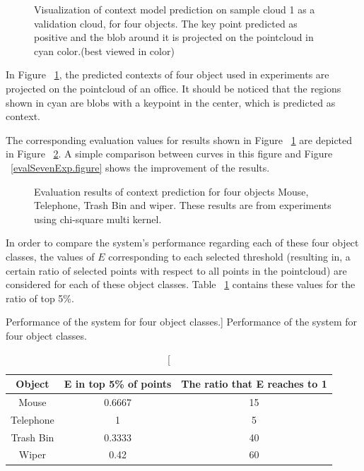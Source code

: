 \begin{figure} [htp]
\begin{center}
  \end{center}
  \caption[Visualization of context model prediction on sample cloud 1 from validation set.]
  {Visualization of context model prediction on sample cloud 1 as a validation cloud, for four objects. The key point predicted as positive and the blob around it is projected on the pointcloud in cyan color.(best viewed in color)}
  \label{ContextPrediction_518_1.figure:edge}
\end{figure}

In Figure ~\ref{ContextPrediction_518_1.figure:edge}, the predicted contexts of four object used in experiments 
are projected on the pointcloud of an office.
It should be noticed that the regions shown in cyan are blobs with a keypoint in the center, which is predicted as 
context.

The corresponding evaluation values for results shown in Figure ~\ref{ContextPrediction_518_1.figure:edge} are depicted
in Figure ~\ref{Eval_518_1.figure}.
A simple comparison between curves in this figure and Figure ~\ref{evalSevenExp.figure} shows the improvement of the 
results.

\begin{figure}
  \begin{center}
  \caption[Evaluation results for four object classes.]
  {Evaluation results of context prediction for four objects Mouse, Telephone, Trash Bin and wiper. These results are from experiments using chi-square multi kernel.}
  \label{Eval_518_1.figure}
  \end{center}
\end{figure}

In order to compare the system's performance regarding each of these four object classes, the values of $E$ corresponding to each selected threshold (resulting in, a certain ratio of selected points with respect to all points in the pointcloud) are considered for each of these object classes.
Table ~\ref{performance.table} contains these values for the ratio of top 5\%.

\begin{table}
\centering
\caption
[Performance of the system for four object classes.]
{Performance of the system for four object classes.}
\label{performance.table}
\begin{tabular}{|c|c|c|}
\hline
Object & E in top 5\% of points & The ratio that E reaches to 1 \\
\hline
      Mouse & 0.6667 & 15 \\
\hline
      Telephone & 1 & 5 \\
\hline
      Trash Bin & 0.3333 &  40\\
\hline
      Wiper & 0.42 & 60 \\
\hline
\end{tabular}
\end{table}


